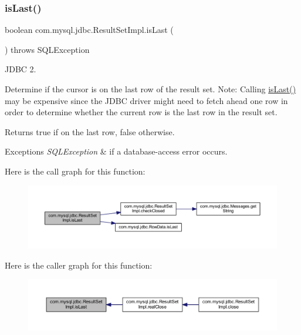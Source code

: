 \subsubsection{\texorpdfstring{is\+Last()}{isLast()}}
{\footnotesize\ttfamily boolean com.\+mysql.\+jdbc.\+Result\+Set\+Impl.\+is\+Last (\begin{DoxyParamCaption}{ }\end{DoxyParamCaption}) throws S\+Q\+L\+Exception}

J\+D\+BC 2.

Determine if the cursor is on the last row of the result set. Note\+: Calling \mbox{\hyperlink{classcom_1_1mysql_1_1jdbc_1_1_result_set_impl_a2eda2389a04bce0a5b22f64bc7b80dab}{is\+Last()}} may be expensive since the J\+D\+BC driver might need to fetch ahead one row in order to determine whether the current row is the last row in the result set. 

\begin{DoxyReturn}{Returns}
true if on the last row, false otherwise.
\end{DoxyReturn}

\begin{DoxyExceptions}{Exceptions}
{\em S\+Q\+L\+Exception} & if a database-\/access error occurs. \\
\hline
\end{DoxyExceptions}
Here is the call graph for this function\+:
\nopagebreak
\begin{figure}[H]
\begin{center}
\leavevmode
\includegraphics[width=350pt]{classcom_1_1mysql_1_1jdbc_1_1_result_set_impl_a2eda2389a04bce0a5b22f64bc7b80dab_cgraph}
\end{center}
\end{figure}
Here is the caller graph for this function\+:
\nopagebreak
\begin{figure}[H]
\begin{center}
\leavevmode
\includegraphics[width=350pt]{classcom_1_1mysql_1_1jdbc_1_1_result_set_impl_a2eda2389a04bce0a5b22f64bc7b80dab_icgraph}
\end{center}
\end{figure}
\mbox{\label{classcom_1_1mysql_1_1jdbc_1_1_result_set_impl_ab3e82ce2b3fcc531558c942e42f554c3}} 
